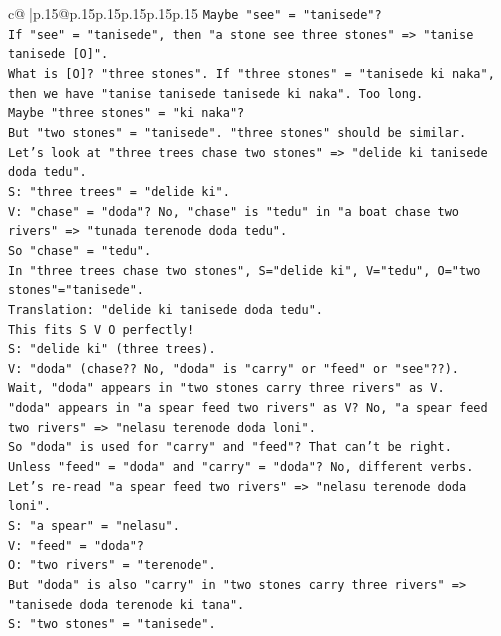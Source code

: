 \documentclass{article}
\begin{document}
{\begin{supertabular}{c@{$\;$}|p{.15\linewidth}@{}p{.15\linewidth}p{.15\linewidth}p{.15\linewidth}p{.15\linewidth}p{.15\linewidth}}
{{{\texttt{Maybe "see" = "tanisede"?} \\
\texttt{If "see" = "tanisede", then "a stone see three stones" => "tanise tanisede {[}O{]}".} \\
\texttt{What is {[}O{]}? "three stones". If "three stones" = "tanisede ki naka", then we have "tanise tanisede tanisede ki naka". Too long.} \\
\texttt{Maybe "three stones" = "ki naka"?} \\
\texttt{But "two stones" = "tanisede". "three stones" should be similar.} \\
\texttt{Let's look at "three trees chase two stones" => "delide ki tanisede doda tedu".} \\
\texttt{S: "three trees" = "delide ki".} \\
\texttt{V: "chase" = "doda"? No, "chase" is "tedu" in "a boat chase two rivers" => "tunada terenode doda tedu".} \\
\texttt{So "chase" = "tedu".} \\
\texttt{In "three trees chase two stones", S="delide ki", V="tedu", O="two stones"="tanisede".} \\
\texttt{Translation: "delide ki tanisede doda tedu".} \\
\texttt{This fits S V O perfectly!} \\
\texttt{S: "delide ki" (three trees).} \\
\texttt{V: "doda" (chase?? No, "doda" is "carry" or "feed" or "see"??).} \\
\texttt{Wait, "doda" appears in "two stones carry three rivers" as V.} \\
\texttt{"doda" appears in "a spear feed two rivers" as V? No, "a spear feed two rivers" => "nelasu terenode doda loni".} \\
\texttt{So "doda" is used for "carry" and "feed"? That can't be right.} \\
\texttt{Unless "feed" = "doda" and "carry" = "doda"? No, different verbs.} \\
\texttt{Let's re{-}read "a spear feed two rivers" => "nelasu terenode doda loni".} \\
\texttt{S: "a spear" = "nelasu".} \\
\texttt{V: "feed" = "doda"?} \\
\texttt{O: "two rivers" = "terenode".} \\
\texttt{But "doda" is also "carry" in "two stones carry three rivers" => "tanisede doda terenode ki tana".} \\
\texttt{S: "two stones" = "tanisede".} \\
}}}
\end{supertabular}}
\end{document}
